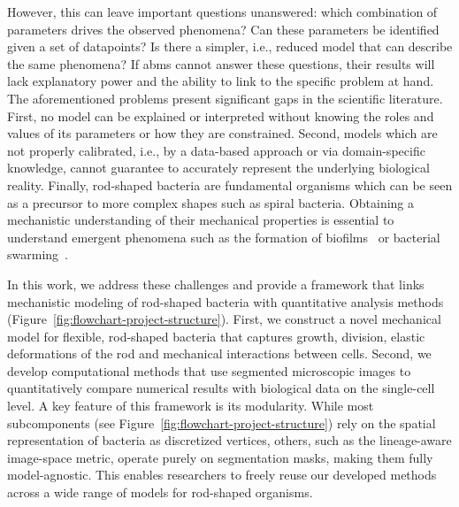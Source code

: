 However, this can leave important questions unanswered:
which combination of parameters drives the observed phenomena?
Can these parameters be identified given a set of datapoints?
Is there a simpler, i.e., reduced model that can describe the same phenomena?
If \acp{abm} cannot answer these questions, their results will lack explanatory power and the
ability to link to the specific problem at hand.\\
The aforementioned problems present significant gaps in the scientific literature.
First, no model can be explained or interpreted without knowing the roles and values of its
parameters or how they are constrained. Second, models which are not properly calibrated,
i.e., by a data-based approach or via
domain-specific knowledge, cannot guarantee to accurately represent the underlying biological
reality.
Finally, rod-shaped bacteria are fundamental organisms which can be seen as a precursor to
more complex shapes such as spiral bacteria.
Obtaining a mechanistic understanding of their mechanical properties is essential to understand
emergent phenomena such as the formation of biofilms~\cite{Li2025} or bacterial
swarming~\cite{Starru2007}.

In this work, we address these challenges
and provide a framework that links mechanistic modeling of rod-shaped bacteria with quantitative
analysis methods (Figure~\ref{fig:flowchart-project-structure}).
First, we construct a novel mechanical model for flexible, rod-shaped bacteria that captures growth,
division, elastic deformations of the rod and mechanical interactions between cells.
Second, we develop computational methods that use segmented microscopic images to
quantitatively compare numerical results with biological data on the single-cell level.
A key feature of this framework is its modularity.
While most subcomponents (see Figure~\ref{fig:flowchart-project-structure}) rely on the spatial
representation of bacteria as discretized vertices, others, such as the lineage-aware image-space
metric, operate purely on segmentation masks, making them fully model-agnostic.
This enables researchers to freely reuse our developed methods across a wide range of models for
rod-shaped organisms.

